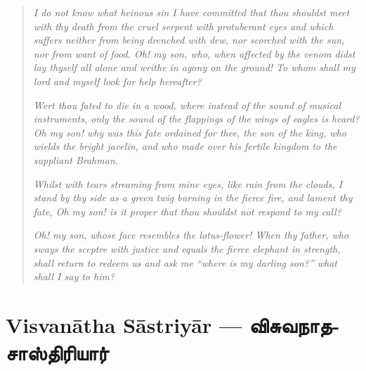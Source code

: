 \documentclass{article}
\newcommand{\TamilBold}[1]{\texttamil{\textbf{#1}}}
\newcommand{\tambold}[1]{\TamilBold{#1}}
\begin{document}
\begin{quotation}\small
\emph{I do not know what heinous sin I have committed that thou shouldst meet with thy death from the cruel serpent with protuberant eyes and which suffers neither from being drenched with dew, nor scorched with the sun, nor from want of food. Oh! my son, who, when affected by the venom didst lay thyself all alone and writhe in agony on the ground! To whom shall my lord and myself look for help hereafter?}

\emph{Wert thou fated to die in a wood, where instead of the sound of musical instruments, only the sound of the flappings of the wings of eagles is heard? Oh my son! why was this fate ordained for thee, the son of the king, who wields the bright javelin, and who made over his fertile kingdom to the suppliant Brahman.}

\emph{Whilst with tears streaming from mine eyes, like rain from the clouds, I stand by thy side as a green twig burning in the fierce fire, and lament thy fate, Oh my son! is it proper that thou shouldst not respond to my call?}

\emph{Oh! my son, whose face resembles the lotus-flower! When thy father, who sways the sceptre with justice and equals the fierce elephant in strength, shall return to redeem us and ask me ``where is my darling son?'' what shall I say to him?}
\end{quotation}
\section{Visvan\={a}tha S\={a}striy\={a}r --- \tambold{விசுவநாதசாஸ்திரியார்}}
\end{document}
